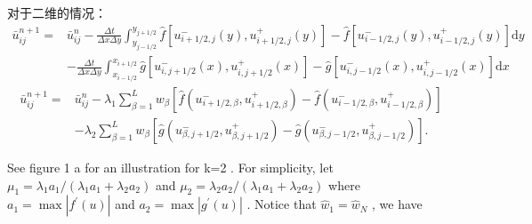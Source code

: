 \documentclass{book}
\begin{document}
对于二维的情况：
\begin{equation}
    \begin{aligned}
        \bar{u}_{i j}^{n+1}= & \bar{u}_{i j}^{n}-\frac{\Delta t}{\Delta x \Delta y} \int_{y_{j-1 / 2}}^{y_{j+1 / 2}} \hat{f}\left[u_{i+1 / 2, j}^{-}(y), u_{i+1 / 2, j}^{+}(y)\right]-\hat{f}\left[u_{i-1 / 2, j}^{-}(y), u_{i-1 / 2, j}^{+}(y)\right] \mathrm{d} y \\
                             & -\frac{\Delta t}{\Delta x \Delta y} \int_{x_{i-1 / 2}}^{x_{i+1 / 2}} \hat{g}\left[u_{i, j+1 / 2}^{-}(x), u_{i, j+1 / 2}^{+}(x)\right]-\hat{g}\left[u_{i, j-1 / 2}^{-}(x), u_{i, j-1 / 2}^{+}(x)\right] \mathrm{d} x
    \end{aligned}
\end{equation}
\begin{equation}
    \begin{aligned}
        \bar{u}_{i j}^{n+1}= & \bar{u}_{i j}^{n}-\lambda_{1} \sum_{\beta=1}^{L} w_{\beta}\left[\hat{f}\left(u_{i+1 / 2, \beta}^{-}, u_{i+1 / 2, \beta}^{+}\right)-\hat{f}\left(u_{i-1 / 2, \beta}^{-}, u_{i-1 / 2, \beta}^{+}\right)\right] \\
                             & -\lambda_{2} \sum_{\beta=1}^{L} w_{\beta}\left[\hat{g}\left(u_{\beta, j+1 / 2}^{-}, u_{\beta, j+1 / 2}^{+}\right)-\hat{g}\left(u_{\beta, j-1 / 2}^{-}, u_{\beta, j-1 / 2}^{+}\right)\right] .
    \end{aligned}
\end{equation}


See figure  1 a  for an illustration for  k=2 . For simplicity, let  $\mu_{1}=\lambda_{1} a_{1} /\left(\lambda_{1} a_{1}+\right.   \left.\lambda_{2} a_{2}\right)$  and  $\mu_{2}=\lambda_{2} a_{2} /\left(\lambda_{1} a_{1}+\lambda_{2} a_{2}\right) $ where  $a_{1}=\max \left|f^{\prime}(u)\right|$  and  $a_{2}=\max \left|g^{\prime}(u)\right|$ . Notice that  $\hat{w}_{1}=\hat{w}_{N}$ , we have
\end{document}
